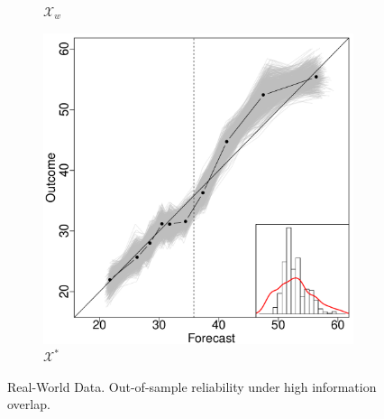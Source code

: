 \documentclass[11pt]{article}
\theoremstyle{definition}
\theoremstyle{definition}
\begin{document}
\begin{figure}[H]
\begin{subfigure}[b]{0.323\textwidth}
                \caption{$\mathcal{X}_w$}
                \label{fig:gull}
        \end{subfigure}%
        \begin{subfigure}[b]{0.323\textwidth}
                \includegraphics[width=\textwidth]{DependentE-OLP.pdf}
                \caption{$\mathcal{X}^*$}
                \label{DepEOLPConrete}
        \end{subfigure}
          \caption{Real-World Data. Out-of-sample reliability under high information overlap. }
               \label{RelDiagramHigh}
\end{figure}
\end{document}
